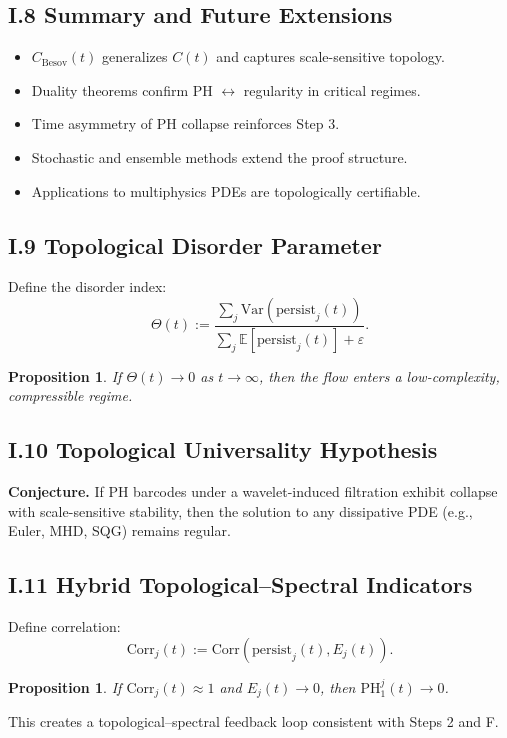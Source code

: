 \documentclass[11pt]{article}
\newtheorem{proposition}[theorem]{Proposition}
\theoremstyle{definition}
\begin{document}
\subsection*{I.8 Summary and Future Extensions}
\begin{itemize}
  \item $C_{\mathrm{Besov}}(t)$ generalizes $C(t)$ and captures scale-sensitive topology.
  \item Duality theorems confirm PH \ensuremath{\leftrightarrow} regularity in critical regimes.
  \item Time asymmetry of PH collapse reinforces Step 3.
  \item Stochastic and ensemble methods extend the proof structure.
  \item Applications to multiphysics PDEs are topologically certifiable.
\end{itemize}

\subsection*{I.9 Topological Disorder Parameter}
Define the disorder index:
\[
\Theta(t) := \frac{\sum_j \mathrm{Var}(\mathrm{persist}_j(t))}{\sum_j \mathbb{E}[\mathrm{persist}_j(t)] + \varepsilon}.
\]
\begin{proposition}
If $\Theta(t) \to 0$ as $t \to \infty$, then the flow enters a low-complexity, compressible regime.
\end{proposition}

\subsection*{I.10 Topological Universality Hypothesis}
\textbf{Conjecture.} If PH barcodes under a wavelet-induced filtration exhibit collapse with scale-sensitive stability, then the solution to any dissipative PDE (e.g., Euler, MHD, SQG) remains regular.

\subsection*{I.11 Hybrid Topological--Spectral Indicators}
Define correlation:
\[
\mathrm{Corr}_j(t) := \mathrm{Corr}(\mathrm{persist}_j(t), E_j(t)).
\]
\begin{proposition}
If $\mathrm{Corr}_j(t) \approx 1$ and $E_j(t) \to 0$, then $\mathrm{PH}_1^j(t) \to 0$.
\end{proposition}
This creates a topological–spectral feedback loop consistent with Steps 2 and F.
\end{document}
